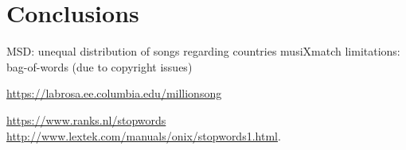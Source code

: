 \documentclass[11pt]{article}
\renewcommand\_{\textunderscore\allowbreak}
\begin{document}
	
\section{Conclusions}

MSD: unequal distribution of songs regarding countries
musiXmatch limitations: bag-of-words (due to copyright issues)





\begin{thebibliography}{}

\url{https://labrosa.ee.columbia.edu/millionsong}

\url{https://www.ranks.nl/stopwords}\\
\url{http://www.lextek.com/manuals/onix/stopwords1.html}.


\end{thebibliography}
\end{document}
